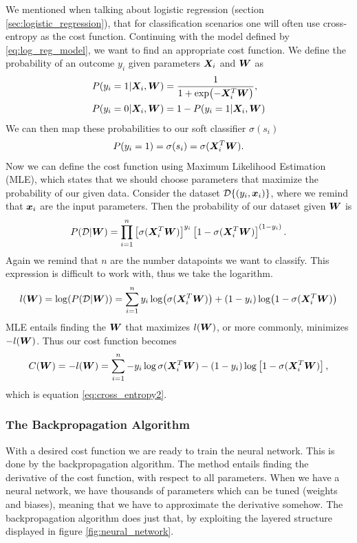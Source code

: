 \documentclass[12pt]{extarticle}
\begin{document}
We mentioned when talking about logistic regression (section \ref{sec:logistic_regression}), that for classification scenarios one will often use cross-entropy as the cost function. Continuing with the model defined by \eqref{eq:log_reg_model}, we want to find an appropriate cost function. We define the probability of an outcome $y_i$ given parameters $\boldsymbol X_i$ and $\boldsymbol W$ as
\begin{align}
	P(y_i = 1|\boldsymbol X_i, \boldsymbol W) & = \frac{1}{1 + \exp(-\boldsymbol X_i^T \boldsymbol W)}, \\
	P(y_i = 0|\boldsymbol X_i, \boldsymbol W) & = 1 - P(y_i = 1|\boldsymbol X_i, \boldsymbol W)
\end{align}
We can then map these probabilities to our soft classifier $\sigma(s_i)$
\begin{align}
	P(y_i = 1) = \sigma(s_i) = \sigma(\boldsymbol X_i^T \boldsymbol W).
\end{align}
Now we can define the cost function using Maximum Likelihood Estimation (MLE), which states that we should choose parameters that maximize the probability of our given data. Consider the dataset $\mathcal{D}\{(y_i, \boldsymbol x_i)\}$, where we remind that $\boldsymbol x_i$ are the input parameters. Then the probability of our dataset given $\boldsymbol W$ is
\begin{align}
	P(\mathcal{D}|\boldsymbol W) = \prod_{i=1}^{n} \left[\sigma(\boldsymbol X_i^T\boldsymbol W)\right]^{y_i} \left[1 - \sigma(\boldsymbol X_i^T\boldsymbol W)\right]^{(1 - y_i)}.
\end{align}
Again we remind that $n$ are the number datapoints we want to classify. This expression is difficult to work with, thus we take the logarithm.
\begin{align}
	l(\boldsymbol W) = \log(P(\mathcal{D}|\boldsymbol W)) = \sum_{i = 1}^n y_i\log(\sigma(\boldsymbol X_i^T \boldsymbol W)) + (1-y_i)\log(1 - \sigma(\boldsymbol X_i^T \boldsymbol W))
\end{align}
MLE entails finding the $\boldsymbol W$ that maximizes $l(\boldsymbol W)$, or more commonly, minimizes $-l(\boldsymbol W)$. Thus our cost function becomes
\begin{align}
	C(\boldsymbol W) = -l(\boldsymbol W) = \sum_{i = 1}^{n} -y_i \log\sigma(\boldsymbol X_i^T \boldsymbol W) - (1 - y_i)\log\left[1 - \sigma(\boldsymbol X^T_i \boldsymbol W)\right],
	\label{eq:cross_entropy}
\end{align}
which is equation \eqref{eq:cross_entropy2}.

\subsubsection{The Backpropagation Algorithm} \label{sec:back_prop}
With a desired cost function we are ready to train the neural network. This is done by the backpropagation algorithm. The method entails finding the derivative of the cost function, with respect to all parameters. When we have a neural network, we have thousands of parameters which can be tuned (weights and biases), meaning that we have to approximate the derivative somehow. The backpropagation algorithm does just that, by exploiting the layered structure displayed in figure \ref{fig:neural_network}.
\end{document}
